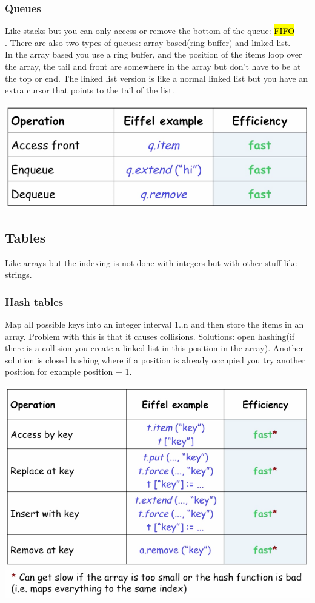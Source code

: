 \documentclass[11pt]{article}
\begin{document}
\subsubsection{Queues}
Like stacks but you can only access or remove the bottom of the queue: \hl{FIFO\\}. There are also two types of queues: array based(ring buffer) and linked list.\\In the array based you use a ring buffer, and the position of the items loop over the array, the tail and front are somewhere in the array but don't have to be at the top or end. The linked list version is like a normal linked list but you have an extra cursor that points to the tail of the list.
\begin{center}
	\includegraphics[width = 15cm]{Eprog/queue}
\end{center}

\subsection{Tables}
Like arrays but the indexing is not done with integers but with other stuff like strings.
\subsubsection{Hash tables}
Map all possible keys into an integer interval 1..n and then store the items in an array. Problem with this is that it causes collisions. Solutions: open hashing(if there is a collision you create a linked list in this position in the array). Another solution is closed hashing where if a position is already occupied you try another position for example position + 1.
\begin{center}
	\includegraphics[width = 15cm]{Eprog/table}
\end{center}
\end{document}
